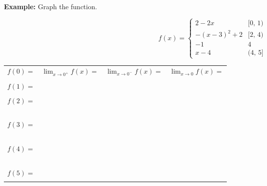 \noindent\textbf{Example:} Graph the function.\\
\begin{minipage}{0.30\linewidth}
    \[f(x)=
        \begin{cases}
        2-2x        &   [0,\,1)\\
        -(x-3)^2+2  &   [2,\,4)\\
        -1          &   4\\
        x-4         &   (4,\,5]
        \end{cases}
    \]
\end{minipage}
\hfill
\begin{minipage}{0.65\linewidth}
    \begin{center}
    \end{center}
\end{minipage}

\begin{longtable}{|m{3.667cm}|m{3.667cm}|m{3.667cm}|m{3.7cm}|}
    \hline
    $\displaystyle f(0)=$   &   $\displaystyle\lim_{x\to0^+}f(x)=$  &   $\displaystyle\lim_{x\to0^-}f(x)=$  &   $\displaystyle\lim_{x\to0}f(x)=$ \\
                            &   &   &   \\\hline
    $\displaystyle f(1)=$   &   &   &   \\
                            &   &   &   \\\hline
    $\displaystyle f(2)=$   &   &   &   \\\
                            &   &   &   \\\hline
    $\displaystyle f(3)=$   &   &   &   \\\
                            &   &   &   \\\hline
    $\displaystyle f(4)=$   &   &   &   \\\
                            &   &   &   \\\hline
    $\displaystyle f(5)=$   &   &   &   \\
                            &   &   &   \\\hline
\end{longtable}

\newpage

